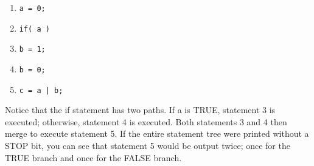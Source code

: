\begin{enumerate}
\item 


\footnotesize\begin{verbatim}a = 0; 
\end{verbatim}\normalsize 
\item 


\footnotesize\begin{verbatim}if( a ) 
\end{verbatim}\normalsize 
\item 


\footnotesize\begin{verbatim}b = 1; 
\end{verbatim}\normalsize 
\item 


\footnotesize\begin{verbatim}b = 0; 
\end{verbatim}\normalsize 
\item 


\footnotesize\begin{verbatim}c = a | b; 
\end{verbatim}\normalsize 
\end{enumerate}


 Notice that the if statement has two paths. If a is TRUE, statement 3 is executed; otherwise, statement 4 is executed. Both statements 3 and 4 then merge to execute statement 5. If the entire statement tree were printed without a STOP bit, you can see that statement 5 would be output twice; once for the TRUE branch and once for the FALSE branch.

